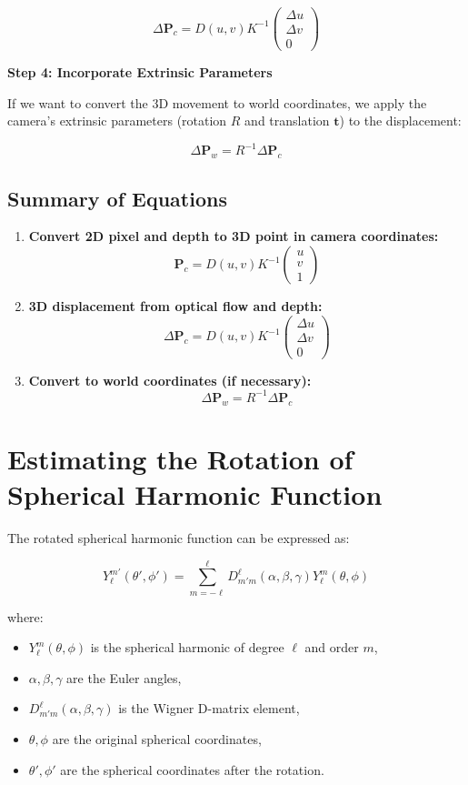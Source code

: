 \[
\Delta \mathbf{P}_c = D(u, v) K^{-1} \begin{pmatrix} \Delta u \\ \Delta v \\ 0 \end{pmatrix}
\]

\textbf{Step 4: Incorporate Extrinsic Parameters}

If we want to convert the 3D movement to world coordinates, we apply the camera's extrinsic parameters (rotation \( R \) and translation \( \mathbf{t} \)) to the displacement:

\[
\Delta \mathbf{P}_w = R^{-1} \Delta \mathbf{P}_c
\]

\subsection{Summary of Equations}
\begin{enumerate}
	\item \textbf{Convert 2D pixel and depth to 3D point in camera coordinates:}
	\[
	\mathbf{P}_c = D(u, v) K^{-1} \begin{pmatrix} u \\ v \\ 1 \end{pmatrix}
	\]
	\item \textbf{3D displacement from optical flow and depth:}
	\[
	\Delta \mathbf{P}_c = D(u, v) K^{-1} \begin{pmatrix} \Delta u \\ \Delta v \\ 0 \end{pmatrix}
	\]
	\item \textbf{Convert to world coordinates (if necessary):}
	\[
	\Delta \mathbf{P}_w = R^{-1} \Delta \mathbf{P}_c
	\]
\end{enumerate}


\section{Estimating the Rotation of Spherical Harmonic Function}
The rotated spherical harmonic function can be expressed as:

\[
Y_{\ell}^{m'}(\theta', \phi') = \sum_{m=-\ell}^{\ell} D^{\ell}_{m'm}(\alpha, \beta, \gamma) Y_{\ell}^{m}(\theta, \phi)
\]

where:
\begin{itemize}
	\item \( Y_{\ell}^{m}(\theta, \phi) \) is the spherical harmonic of degree \( \ell \) and order \( m \),
	\item \( \alpha, \beta, \gamma \) are the Euler angles,
	\item \( D^{\ell}_{m'm}(\alpha, \beta, \gamma) \) is the Wigner D-matrix element,
	\item \( \theta, \phi \) are the original spherical coordinates,
	\item \( \theta', \phi' \) are the spherical coordinates after the rotation.
\end{itemize}

